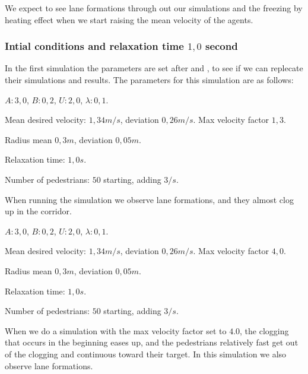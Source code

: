 We expect to see lane formations through out our simulations
and the freezing by heating effect when we start raising the mean velocity
of the agents.

\subsubsection{Intial conditions and relaxation time $1,0$ second}
In the first simulation the parameters are set after \cite{ABconstant} and
\cite{self-org}, to see if we can replecate their simulations and results.
The parameters for this simulation are as follows:

\begin{itemize*}
    \item $A: 3,0$, $B: 0,2$, $U: 2,0$, $\lambda: 0,1$.
    \item Mean desired velocity: $1,34 m/s$, deviation $0,26 m/s$. Max 
        velocity factor $1,3$.
    \item Radius mean $0,3 m$, deviation $0,05 m$.
    \item Relaxation time: $1,0 s$.
    \item Number of pedestrians: $50$ starting, adding $3/s$.
\end{itemize*}

When running the simulation we observe lane formations, and they almost clog up
in the corridor.

\begin{itemize*}
    \item $A: 3,0$, $B: 0,2$, $U: 2,0$, $\lambda: 0,1$.
    \item Mean desired velocity: $1,34 m/s$, deviation $0,26 m/s$. Max 
        velocity factor $4,0$.
    \item Radius mean $0,3 m$, deviation $0,05 m$.
    \item Relaxation time: $1,0 s$.
    \item Number of pedestrians: $50$ starting, adding $3/s$.
\end{itemize*}

When we do a simulation with the max velocity factor set to $4.0$, the clogging
that occurs in the beginning eases up, and the pedestrians relatively fast
get out of the clogging and continuous toward their target. In this simulation
we also observe lane formations.

